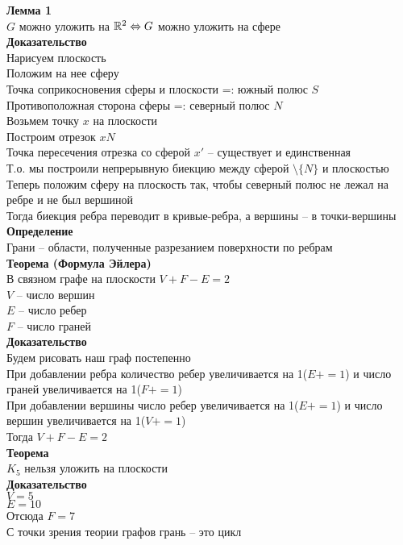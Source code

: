 \documentclass[12pt]{article}
\begin{document}
\textbf{Лемма 1}\\
$G$ можно уложить на $\mathbb{R}^2 \Leftrightarrow G$ можно уложить на сфере\\
\textbf{Доказательство}\\
Нарисуем плоскость\\
Положим на нее сферу\\
Точка соприкосновения сферы и плоскости =: южный полюс $S$\\
Противоположная сторона сферы =: северный полюс $N$\\
Возьмем точку $x$ на плоскости\\
Построим отрезок $xN$\\
Точка пересечения отрезка со сферой $x'$ -- существует и единственная\\
Т.о. мы построили непрерывную биекцию между сферой $\setminus \{N\}$ и плоскостью\\
Теперь положим сферу на плоскость так, чтобы северный полюс не лежал на ребре и не был вершиной\\
Тогда биекция ребра переводит в кривые-ребра, а вершины -- в точки-вершины\\
\textbf{Определение}\\
Грани -- области, полученные разрезанием поверхности по ребрам\\
\textbf{Теорема (Формула Эйлера)}\\
В связном графе на плоскости $V + F - E = 2$\\
$V$ -- число вершин\\
$E$ -- число ребер\\
$F$ -- число граней\\
\textbf{Доказательство}\\
Будем рисовать наш граф постепенно\\
При добавлении ребра количество ребер увеличивается на 1($E+=1$) и число граней увеличивается на 1($F+=1$)\\
При добавлении вершины число ребер увеличивается на 1($E+=1$) и число вершин увеличивается на 1($V+=1$)\\
Тогда $V + F - E = 2$\\
\textbf{Теорема}\\
$K_5$ нельзя уложить на плоскости\\
\textbf{Доказательство}\\
$V=5$\\
$E=10$\\
Отсюда $F = 7$\\
С точки зрения теории графов грань -- это цикл\\
\end{document}
